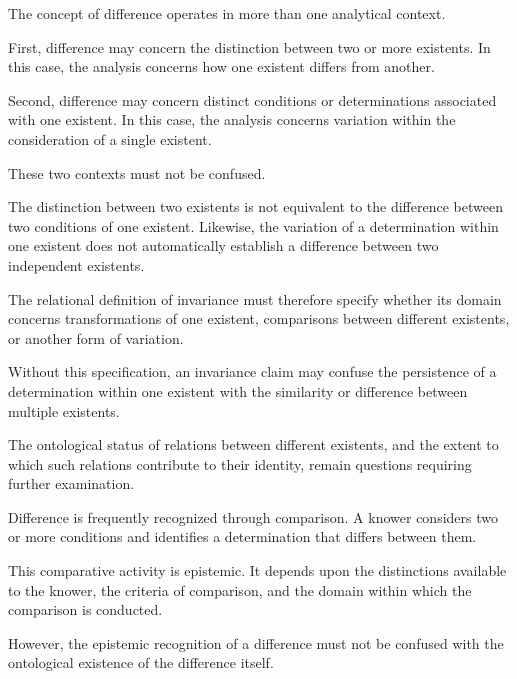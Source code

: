 
The concept of difference operates in more than
one analytical context.

First, difference may concern the distinction
between two or more existents. In this case,
the analysis concerns how one existent differs
from another.

Second, difference may concern distinct conditions
or determinations associated with one existent.
In this case, the analysis concerns variation
within the consideration of a single existent.

These two contexts must not be confused.

The distinction between two existents is not
equivalent to the difference between two conditions
of one existent. Likewise, the variation of
a determination within one existent does not
automatically establish a difference between
two independent existents.

The relational definition of invariance must
therefore specify whether its domain concerns
transformations of one existent, comparisons
between different existents, or another form
of variation.

Without this specification, an invariance claim
may confuse the persistence of a determination
within one existent with the similarity or
difference between multiple existents.

The ontological status of relations between
different existents, and the extent to which
such relations contribute to their identity,
remain questions requiring further examination.


Difference is frequently recognized through
comparison. A knower considers two or more
conditions and identifies a determination
that differs between them.

This comparative activity is epistemic.
It depends upon the distinctions available
to the knower, the criteria of comparison,
and the domain within which the comparison
is conducted.

However, the epistemic recognition of a
difference must not be confused with the
ontological existence of the difference itself.


